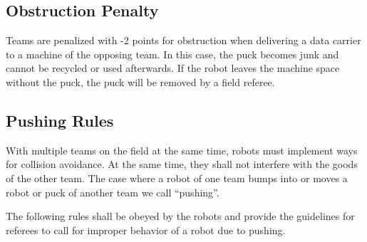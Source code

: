 \documentclass[12pt,twoside]{article}
\begin{document}
\subsection{Obstruction Penalty}
Teams are penalized with -2 points for obstruction when delivering a
data carrier to a machine of the opposing team.  In this case, the
puck becomes junk and cannot be recycled or used afterwards. If the
robot leaves the machine space without the puck, the puck will be
removed by a field referee.

\subsection{Pushing Rules}
With multiple teams on the field at the same time, robots must
implement ways for collision avoidance. At the same time, they shall
not interfere with the goods of the other team. The case where a robot
of one team bumps into or moves a robot or puck of another team we
call ``pushing''.

The following rules shall be obeyed by the robots and provide the
guidelines for referees to call for improper behavior of a robot due
to pushing.
\end{document}

